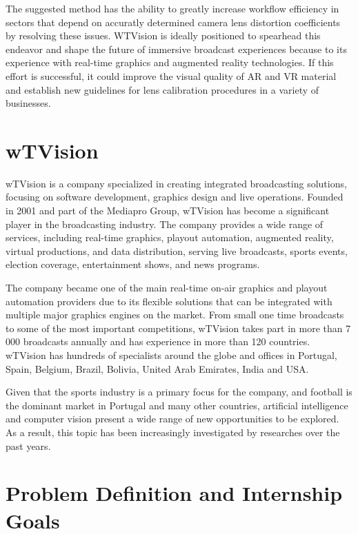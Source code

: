 \noindent The suggested method has the ability to greatly increase workflow efficiency in sectors that depend on accuratly determined camera lens distortion coefficients by resolving these issues. WTVision is ideally positioned to spearhead this endeavor and shape the future of immersive broadcast experiences because to its experience with real-time graphics and augmented reality technologies. If this effort is successful, it could improve the visual quality of AR and VR material and establish new guidelines for lens calibration procedures in a variety of businesses.
\section{wTVision}\label{sec:wTVision}


\noindent wTVision is a company \cite{wtvision} specialized in creating integrated broadcasting solutions, focusing on software development, graphics design and live operations.
\noindent Founded in 2001 and part of the Mediapro Group, wTVision has become a significant player in the broadcasting industry. The company provides a wide range of services, including real-time graphics, playout automation, augmented reality, virtual productions, and data distribution, serving live broadcasts, sports events, election coverage, entertainment shows, and news programs.


\noindent The company became one of the main real-time on-air graphics and playout automation providers due to its flexible solutions that can be integrated with multiple major graphics engines on the market. From small one time broadcasts to some of the most important competitions, wTVision takes part in more than 7 000 broadcasts annually and has experience in more than 120 countries. 
wTVision has hundreds of specialists around the globe and offices in Portugal, Spain, Belgium, Brazil, Bolivia, United Arab Emirates, India and USA.

\noindent Given that the sports industry is a primary focus for the company, and football is the dominant market in Portugal and many other countries, artificial intelligence and computer vision present a wide range of new opportunities to be explored. As a result, this topic has been increasingly investigated by researches over the past years. 


\section{Problem Definition and Internship Goals}\label{sec:intern_goals}

